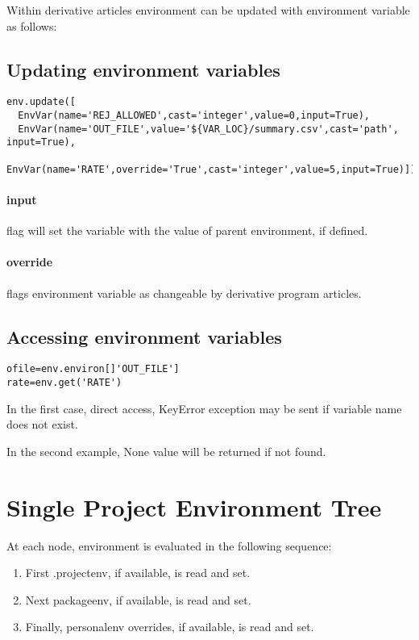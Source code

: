 \documentclass[accord_design.tex]{subfiles}
\begin{document}
Within derivative articles environment can be updated with environment variable as follows:

\subsection{Updating environment variables}
\begin{lstlisting}
env.update([
  EnvVar(name='REJ_ALLOWED',cast='integer',value=0,input=True),
  EnvVar(name='OUT_FILE',value='${VAR_LOC}/summary.csv',cast='path', input=True),
  EnvVar(name='RATE',override='True',cast='integer',value=5,input=True)])
\end{lstlisting}

\paragraph{input} flag will set the variable with the value of parent environment, if defined.
\paragraph{override} flags environment variable as changeable by derivative program articles.

\subsection{Accessing environment variables}
\begin{lstlisting}
ofile=env.environ[]'OUT_FILE']
rate=env.get('RATE')
\end{lstlisting}

In the first case, direct access, KeyError exception may be sent if variable name does not exist.

In the second example, None value will be returned if not found. 


\section{Single Project Environment Tree}
At each node, environment is evaluated in the following sequence:
\begin{enumerate}
	\item First .projectenv, if available, is read and set.
	\item Next packageenv, if available, is read and set.
	\item Finally, personalenv overrides, if available, is read and set.
\end{enumerate} 
\end{document}
